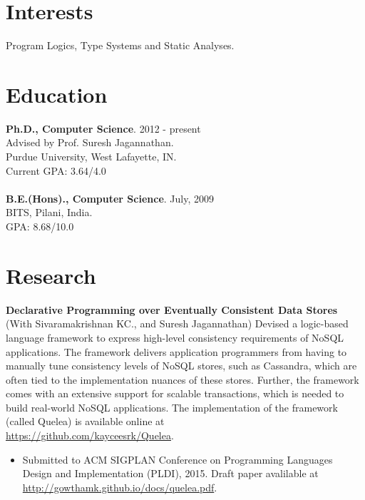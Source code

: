 \documentclass[margin,line]{res}
\begin{document}
 
 
 
\address{http://gowthamk.github.io \hspace{1.25in} gkaki@purdue.edu
          \hspace{1.25in} (201) 417 1775 }

 
\begin{resume} 
 
\section{Interests} 
Program Logics, Type Systems and Static Analyses.

\section{Education} 
{\bf Ph.D., Computer Science}. \hfill 2012 - present\\
Advised by Prof. Suresh Jagannathan.\\
Purdue University, West Lafayette, IN.\\
Current GPA: 3.64/4.0 \\
\\
{\bf B.E.(Hons)., Computer Science}. \hfill July, 2009\\
BITS, Pilani, India.\\
GPA: 8.68/10.0
 

\section{Research}
 {\bf Declarative Programming over Eventually Consistent Data Stores} \\
 (With Sivaramakrishnan KC., and Suresh Jagannathan) Devised a
 logic-based language framework to express high-level consistency
 requirements of NoSQL applications. The framework delivers
 application programmers from having to manually tune consistency
 levels of NoSQL stores, such as Cassandra, which are often tied to
 the implementation nuances of these stores. Further, the framework
 comes with an extensive support for scalable transactions, which is
 needed to build real-world NoSQL applications. The implementation of
 the framework (called {\sc Quelea}) is available online at\\
 \url{https://github.com/kayceesrk/Quelea}.
 \begin{itemize}
 \item Submitted to ACM SIGPLAN Conference on Programming Languages
 Design and Implementation (PLDI), 2015. Draft paper avalilable at
 \url{http://gowthamk.github.io/docs/quelea.pdf}.
 \end{itemize}



\end{resume}
\end{document}
